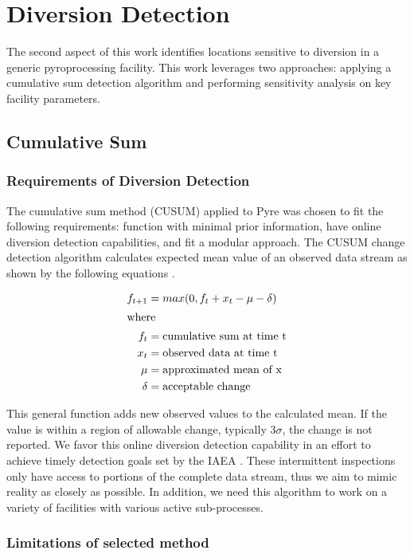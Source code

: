 \chapter[Diversion Detection]{Diversion Detection}

The second aspect of this work identifies locations sensitive to diversion in a generic pyroprocessing facility. This work leverages two approaches: applying
a cumulative sum detection algorithm and performing sensitivity analysis on key facility parameters. 
\section{Cumulative Sum}


\subsection{Requirements of Diversion Detection}
The cumulative sum method (CUSUM) applied to Pyre was chosen to fit the following requirements: function with minimal prior information, have online diversion detection
capabilities, and fit a modular approach. The CUSUM change detection algorithm calculates expected mean value of an observed data stream as shown by the following equations \cite{basseville_detection_1993}.

\begin{align}
	f_{t+1} &= max(0, f_t + x_t - \mu - \delta) \\
	\intertext{where}
	f_t &= \mbox{cumulative sum at time t} \nonumber \\
	x_t &= \mbox{observed data at time t} \nonumber \\
	\mu &= \mbox{approximated mean of x} \nonumber \\
	\delta &= \mbox{acceptable change} \nonumber
\end{align}

This general function adds new observed values to the calculated mean. If the value is within a region of allowable change, typically 3$\sigma$, the change is not reported. 
We favor this online diversion detection capability in an effort to achieve timely detection goals set by the IAEA \cite{international_atomic_energy_agency_implications_2004}.
These intermittent inspections only have access to portions of the complete data stream, thus we aim to mimic reality as closely as possible. In addition, we need this
algorithm to work on a variety of facilities with various active sub-processes.

\subsection{Limitations of selected method}

